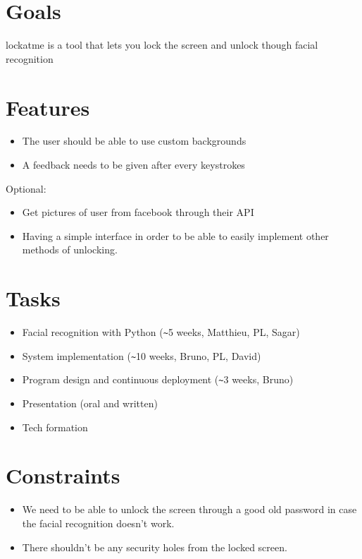 \documentclass{article}
\begin{document}
\section{Goals}
  lockatme is a tool that lets you lock the screen and unlock though facial
  recognition

\section{Features}
  \begin{itemize}
    \item The user should be able to use custom backgrounds
    \item A feedback needs to be given after every keystrokes
  \end{itemize}
  Optional:
  \begin{itemize}
    \item Get pictures of user from facebook through their API
    \item Having a simple interface in order to be able to easily implement
    other methods of unlocking.
  \end{itemize}

\section{Tasks}
  \begin{itemize}
    \item Facial recognition with Python (\verb+~+5 weeks, Matthieu, PL, Sagar)
    \item System implementation (\verb+~+10 weeks, Bruno, PL, David)
    \item Program design and continuous deployment (\verb+~+3 weeks, Bruno)
    \item Presentation (oral and written)
    \item Tech formation
  \end{itemize}

\section{Constraints}
  \begin{itemize}
    \item We need to be able to unlock the screen through a good old password
    in case the facial recognition doesn't work.
   \item There shouldn't be any security holes from the locked screen.
  \end{itemize}
\end{document}
